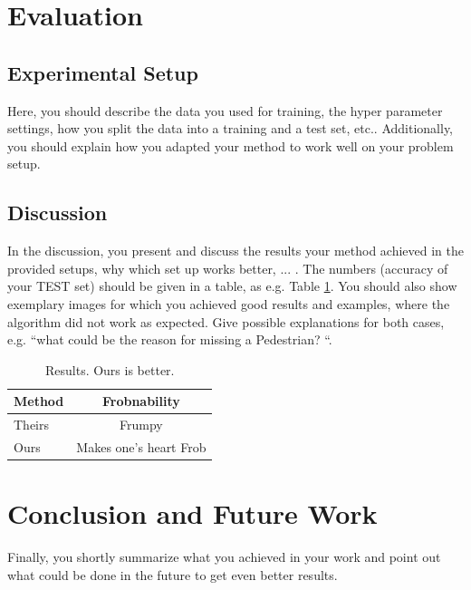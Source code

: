\documentclass[10pt,twocolumn,letterpaper]{article}
\begin{document}

\section{Evaluation}
\subsection{Experimental Setup}
Here, you should describe the data you used for training, the hyper parameter settings, how you split the data into a training and a test set, etc.. Additionally, you should explain how you adapted your method to work well on your problem setup.




\subsection{Discussion}
In the discussion, you present and discuss the results your method achieved in the provided setups, why which set up works better, ... . The numbers (accuracy of your TEST set) should be given in a table, as e.g. Table \ref{tab:results}. You should also show exemplary images for which you achieved good results and examples, where the algorithm did not work as expected. Give possible explanations for both cases, e.g. ``what could be the reason for missing a Pedestrian? ``.

\begin{table}
	\begin{center}
		\begin{tabular}{|l|c|}
			\hline
			Method & Frobnability \\
			\hline\hline
			Theirs & Frumpy \\
			Ours & Makes one's heart Frob\\
			\hline
		\end{tabular}
	\end{center}
	\caption{Results. Ours is better.}
	\label{tab:results}
\end{table}

\section{Conclusion and Future Work}
Finally, you shortly summarize what you achieved in your work and point out what could be done in the future to get even better results. 










{\small


}
\end{document}
